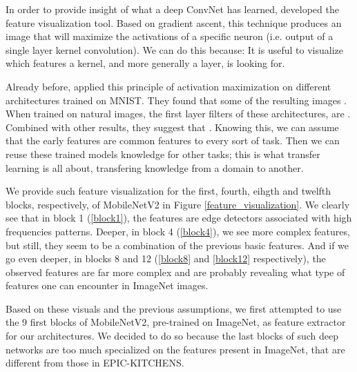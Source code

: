 \documentclass[12pt, a4paper]{report}
\begin{document}
					In order to provide insight of what a deep ConvNet has learned, \cite{olah2017feature} developed the feature visualization tool.
					Based on gradient ascent, this technique produces an image that will maximize the activations of a specific neuron (i.e. output of a single layer kernel convolution).
					We can do this because:  
					It is useful to visualize which features a kernel, and more generally a layer, is looking for.
					\par
					Already before, \cite{erhan2009visualizing} applied this principle of activation maximization on different architectures trained on MNIST.
					They found that some of the resulting images .
					When trained on natural images, the first layer filters of these architectures, are .
					Combined with other results, they suggest that .
				Knowing this, we can assume that the early features are common features to every sort of task.
				Then we can reuse these trained models knowledge for other tasks; this is what transfer learning is all about, transfering knowledge from a domain to another.
				\par
				We provide such feature visualization for the first, fourth, eihgth and twelfth blocks, respectively, of MobileNetV2 in Figure \ref{feature_visualization}.
				We clearly see that in block 1 (\ref{block1}), the features are edge detectors associated with high frequencies patterns.
				Deeper, in block 4 (\ref{block4}), we see more complex features, but still, they seem to be a combination of the previous basic features.
				And if we go even deeper, in blocks 8 and 12 (\ref{block8} and \ref{block12} respectively), the observed features are far more complex and are probably revealing what type of features one can encounter in ImageNet images.
				\par
				Based on these visuals and the previous assumptions, we first attempted to use the 9 first blocks of MobileNetV2, pre-trained on ImageNet, as feature extractor for our architectures.
				We decided to do so because the last blocks of such deep networks are too much specialized on the features present in ImageNet, that are different from those in EPIC-KITCHENS.
\end{document}

